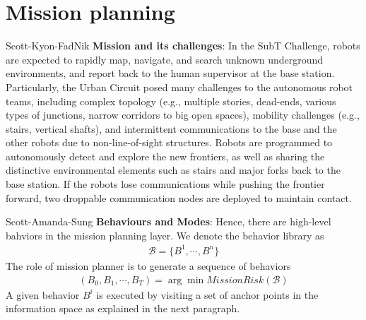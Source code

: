 \documentclass[a4paper, 10pt, conference]{ieeeconf}      %
\newcommand{\ph}[1]{{\textbf{#1}:}} %
\newcommand{\todo}[1]{{\color{red} #1 }} %
\newcommand{\inst}[1]{{\color{orange} #1 }} %
\begin{document}

\section{Mission planning}\label{sec:mission_planning}
\todo{Scott-Kyon-FadNik} \ph{Mission and its challenges} In the SubT Challenge, robots are expected to rapidly map, navigate, and search unknown underground environments, and report back to the human supervisor at the base station. Particularly, the Urban Circuit posed many challenges to the autonomous robot teams, including complex topology (e.g., multiple stories, dead-ends, various types of junctions, narrow corridors to big open spaces), mobility challenges (e.g., stairs, vertical shafts), and intermittent communications to the base and the other robots due to non-line-of-sight structures. Robots are programmed to autonomously detect and explore the new frontiers, as well as sharing the distinctive environmental elements such as stairs and major forks back to the base station. If the robots lose communications while pushing the frontier forward, two droppable communication nodes are deployed to maintain contact.

\todo{Scott-Amanda-Sung} \ph{Behaviours and Modes}
Hence, there are high-level bahviors in the mission planning layer. We denote the behavior library as
\begin{align}
    \mathcal{B} = \{B^1,\cdots,B^n \}
\end{align}
The role of mission planner is to generate a sequence of behaviors
\begin{align}
    (B_0,B_1,\cdots,B_T) = \arg\min MissionRisk(\mathcal{B})
\end{align}
A given behavior $B^i$ is executed by visiting a set of anchor points in the information space as explained in the next paragraph. 
\end{document}
